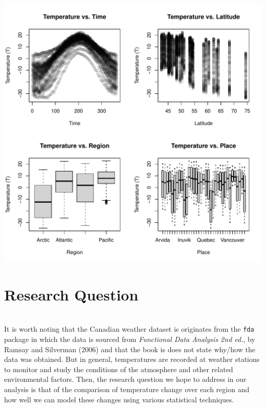 \documentclass[aoas]{imsart}\usepackage[]{graphicx}\usepackage[]{xcolor}
\newenvironment{knitrout}{}{} %
\begin{document}
\begin{knitrout}
\color{fgcolor}

{\centering \includegraphics[width=1.05\linewidth,height=0.58\textheight]{figure/unnamed-chunk-3-1} 

}


\end{knitrout}

\section{Research Question}\hfill\\

It is worth noting that the Canadian weather dataset is originates from the \texttt{fda} package in which the data is sourced from \textit{Functional Data Analysis 2nd ed.}, by Ramsay and Silverman (2006) and that the book is does not state why/how the data was obtained. But in general, temperatures are recorded at weather stations to monitor and study the conditions of the atmosphere and other related environmental factors. Then, the research question we hope to address in our analysis is that of the comparison of temperature change over each region and how well we can model these changes using various statistical techniques.
\end{document}
